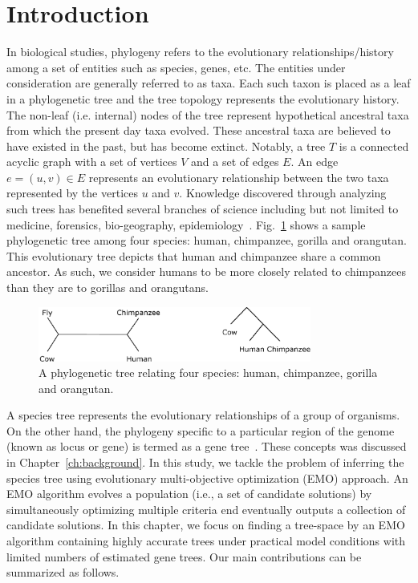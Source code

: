  \section{Introduction}
\label{sec:snoga-intro}
In biological studies, phylogeny refers to the evolutionary relationships/history among a set of entities such as species, genes, etc. The entities under consideration are generally referred to as taxa. Each such taxon is placed as a leaf in a phylogenetic tree and the tree topology represents the evolutionary history. The non-leaf (i.e. internal) nodes of the tree represent hypothetical ancestral taxa from which the present day taxa evolved. These ancestral taxa are believed to have existed in the past, but has become extinct. Notably, a tree $T$ is a connected acyclic graph with a set of vertices $V$ and a set of edges $E$. An edge $e = (u, v) \in E$ represents an evolutionary relationship between the two taxa represented by the vertices $u$ and $v$. Knowledge discovered through analyzing such trees has benefited several branches of science including but not limited to medicine, forensics, bio-geography, epidemiology~\cite{felix2015phylogenetics}. 
Fig.~\ref{fig:outgroup2} shows a sample phylogenetic tree among four species: human, chimpanzee, gorilla and orangutan. This evolutionary tree depicts that human and chimpanzee share a common ancestor. As such, we consider humans to be more closely related to chimpanzees than they are to gorillas and orangutans.

\begin{figure}[!tb]
	\centering
	\includegraphics[width=0.8\textwidth]{Figure/outgroup.eps}
	\caption{A phylogenetic tree relating four species: human, chimpanzee, gorilla and orangutan. }
	\label{fig:outgroup2}
\end{figure}


A species tree represents the evolutionary relationships of a group of organisms. On the other hand, the phylogeny specific to a particular region of the genome (known as locus or gene) is termed as a gene tree~\cite{maddison1997gene}. These concepts was discussed in Chapter~\ref{ch:background}. In this study, we tackle the problem of inferring the species tree using evolutionary multi-objective optimization (EMO) approach. An EMO algorithm evolves a population (i.e., a set of candidate solutions) by simultaneously optimizing multiple criteria end eventually outputs a collection of candidate solutions. In this chapter, we focus on finding a tree-space by an EMO algorithm containing highly accurate trees under practical model conditions with limited numbers of estimated gene trees. Our main contributions can be summarized as follows.

